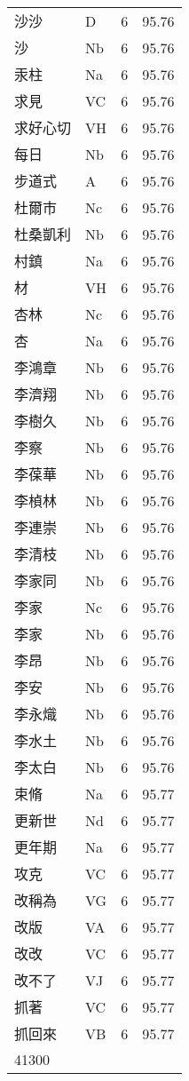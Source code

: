 \documentclass[twocolumn]{book}
\begin{document}
\begin{supertabular}{llrr}
沙沙 & D & 6 &  95.76\\
沙 & Nb & 6 &  95.76\\
汞柱 & Na & 6 &  95.76\\
求見 & VC & 6 &  95.76\\
求好心切 & VH & 6 &  95.76\\
每日 & Nb & 6 &  95.76\\
步道式 & A & 6 &  95.76\\
杜爾市 & Nc & 6 &  95.76\\
杜桑凱利 & Nb & 6 &  95.76\\
村鎮 & Na & 6 &  95.76\\
材 & VH & 6 &  95.76\\
杏林 & Nc & 6 &  95.76\\
杏 & Na & 6 &  95.76\\
李鴻章 & Nb & 6 &  95.76\\
李濟翔 & Nb & 6 &  95.76\\
李樹久 & Nb & 6 &  95.76\\
李察 & Nb & 6 &  95.76\\
李葆華 & Nb & 6 &  95.76\\
李楨林 & Nb & 6 &  95.76\\
李連崇 & Nb & 6 &  95.76\\
李清枝 & Nb & 6 &  95.76\\
李家同 & Nb & 6 &  95.76\\
李家 & Nc & 6 &  95.76\\
李家 & Nb & 6 &  95.76\\
李昂 & Nb & 6 &  95.76\\
李安 & Nb & 6 &  95.76\\
李永熾 & Nb & 6 &  95.76\\
李水土 & Nb & 6 &  95.76\\
李太白 & Nb & 6 &  95.76\\
束脩 & Na & 6 &  95.77\\
更新世 & Nd & 6 &  95.77\\
更年期 & Na & 6 &  95.77\\
攻克 & VC & 6 &  95.77\\
改稱為 & VG & 6 &  95.77\\
改版 & VA & 6 &  95.77\\
改改 & VC & 6 &  95.77\\
改不了 & VJ & 6 &  95.77\\
抓著 & VC & 6 &  95.77\\
抓回來 & VB & 6 &  95.77\\
41300\\

\end{supertabular}
\end{document}

